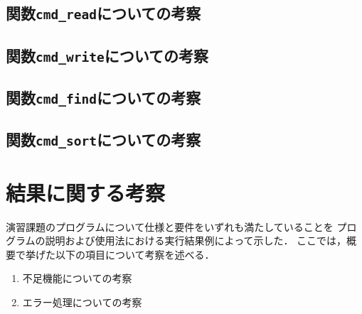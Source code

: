 \documentclass[a4j,11pt]{jarticle}
\begin{document}
\subsection{関数\texttt{cmd\_read}についての考察}
\subsection{関数\texttt{cmd\_write}についての考察}
\subsection{関数\texttt{cmd\_find}についての考察}
\subsection{関数\texttt{cmd\_sort}についての考察}
\section{結果に関する考察}


演習課題のプログラムについて仕様と要件をいずれも満たしていることを
プログラムの説明および使用法における実行結果例によって示した．
ここでは，概要で挙げた以下の項目について考察を述べる．

\begin{enumerate}
\setlength{\parskip}{2pt} \setlength{\itemsep}{2pt}
    \item 不足機能についての考察
    \item エラー処理についての考察
\end{enumerate}
\end{document}
